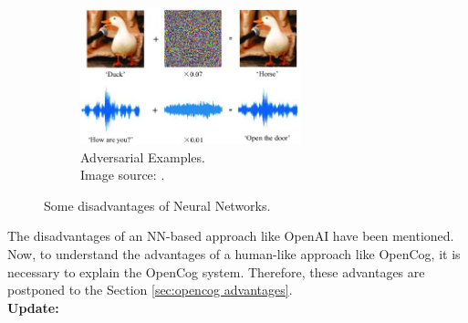 \begin{figure}
\begin{subfigure}{\linewidth}
	\centering
	\includegraphics[width=0.7\textwidth]{figures/Magistrale/05 - adversarial-examples}
	\caption{Adversarial Examples. \\Image source: \cite{img05}.
	\label{fig:adversarial_examples}}
	\end{subfigure}
\caption{Some disadvantages of Neural Networks.}
\label{fig:disadvantages_nn}
\end{figure} 


The disadvantages of an NN-based approach like OpenAI have been mentioned. Now, to understand the advantages of a human-like approach like OpenCog, it is necessary to explain the OpenCog system. Therefore, these advantages are postponed to the Section \ref{sec:opencog advantages}. \\

\textbf{Update:}

